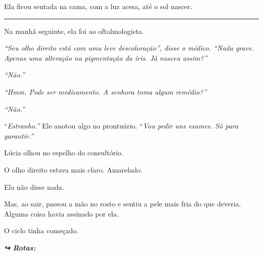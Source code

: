 \noindent Ela ficou sentada na cama, com a luz acesa, até o sol nascer.

\vspace{0.5em}\noindent\rule{\textwidth}{0.5pt}\vspace{0.5em}

\noindent Na manhã seguinte, ela foi ao oftalmologista.

\noindent \textit{\textquotedblleft{}Seu olho direito está com uma leve descoloração\textquotedblright{}\textit{, disse o médico. }\textquotedblleft{}Nada grave. Apenas uma alteração na pigmentação da íris. Já nasceu assim?\textquotedblright{}}

\noindent \textit{\textquotedblleft{}Não.\textquotedblright{}}

\noindent \textit{\textquotedblleft{}Hmm. Pode ser medicamento. A senhora toma algum remédio?\textquotedblright{}}

\noindent \textit{\textquotedblleft{}Não.\textquotedblright{}}

\noindent \textquotedblleft{\textit{Estranho.\textquotedblright{}} Ele anotou algo no prontuário. }\textquotedblleft{\textit{Vou pedir uns exames. Só para garantir.\textquotedblright{}}}

\noindent Lúcia olhou no espelho do consultório.

\noindent O olho direito estava mais claro.
Amarelado.

\noindent Ela não disse nada.

\noindent Mas, ao sair, passou a mão no rosto e sentiu a pele mais fria do que deveria.
\noindent Alguma coisa havia assinado por ela.

\noindent O ciclo tinha começado.

\vspace{0.5em}
\noindent\textit{\textbf{↪ Rotas:}  \rotasep {}}
